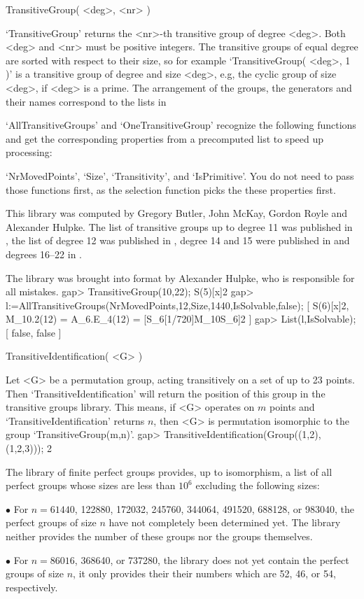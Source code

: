 \>TransitiveGroup( <deg>, <nr> )

`TransitiveGroup'  returns the <nr>-th transitive  group of degree <deg>.
Both  <deg> and <nr> must be  positive integers. The transitive groups of
equal  degree are  sorted with  respect to   their  size, so for  example
`TransitiveGroup(  <deg>, 1 )' is a  transitive group  of degree and size
<deg>, e.g, the cyclic  group  of size <deg>,   if <deg> is a  prime. The
arrangement of  the groups, the  generators and their names correspond to
the lists in \cite{ConwayHulpkeMcKay97}

`AllTransitiveGroups'  and `OneTransitiveGroup'   recognize the following
functions and get the corresponding properties from a precomputed list to
speed up  processing:

`NrMovedPoints', `Size',   `Transitivity', and `IsPrimitive'.  You do not
need to pass  those functions first, as  the selection function picks the
these properties first.

This library was computed by Gregory Butler, John McKay, Gordon Royle and
Alexander  Hulpke. The list  of transitive  groups  up to  degree  11 was
published in \cite{ButlerMcKay83}, the list of degree 12 was published in
\cite{Royle87}, degree 14 and   15 were published in \cite{Butler93}  and
degrees 16--22 in \cite{Hulpke96}.

The library was  brought into {\GAP} format by  Alexander  Hulpke, who is
responsible for all mistakes.
\beginexample
    gap> TransitiveGroup(10,22);
    S(5)[x]2
    gap> l:=AllTransitiveGroups(NrMovedPoints,12,Size,1440,IsSolvable,false);
    [ S(6)[x]2, M_10.2(12) = A_6.E_4(12) = [S_6[1/720]{M_10}S_6]2 ]
    gap> List(l,IsSolvable);
    [ false, false ]
\endexample

\>TransitiveIdentification( <G> )

Let <G> be a permutation group, acting transitively on a set  of up to 23
points.  Then `TransitiveIdentification' will return the position of this
group in the transitive  groups library.  This means,  if <G> operates on
$m$ points and    `TransitiveIdentification'  returns $n$,  then <G>   is
permutation isomorphic to the group `TransitiveGroup(m,n)'.
\beginexample
    gap> TransitiveIdentification(Group((1,2),(1,2,3)));
    2
\endexample

%

The {\GAP} library of finite  perfect groups provides, up to isomorphism,
a list of all perfect groups whose sizes are less than  $10^6$  excluding
the following sizes:
\beginlist
  \item{$\bullet$}
      For $n = 61440$, 122880, 172032, 245760, 344064, 491520, 688128, or
      983040,  the perfect groups  of size  $n$  have not completely been
      determined yet.  The library  neither provides  the number of these
      groups nor the groups themselves.
  \item{$\bullet$}
      For  $n = 86016$,  368640,  or  737280,  the library  does not  yet
      contain  the perfect groups  of size  $n$,  it  only provides their
      their numbers which are 52, 46, or 54, respectively.
\endlist

